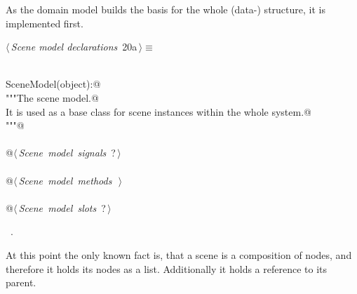 \documentclass[
    a4paper,      %
    10pt,         %
    openright,    %
    notitlepage,  %
    parskip=half, %
]{scrreprt}       %
\theoremstyle{definition}                    %
\begin{document}
As the domain model builds the basis for the whole (data-) structure, it is
implemented first.

\begin{flushleft} \small
\begin{minipage}{\linewidth}\label{scrap12}\raggedright\small
{} $\langle\,${\itshape Scene model declarations}\nobreak\ {\footnotesize {20a}}$\,\rangle\equiv$
\vspace{-1ex}
\begin{list}{}{} \item
\mbox{}\lstinline@@\\
\mbox{}\lstinline@class SceneModel(object):@\\
\mbox{}\lstinline@    """The scene model.@\\
\mbox{}\lstinline@    It is used as a base class for scene instances within the whole system.@\\
\mbox{}\lstinline@    """@\\
\mbox{}\lstinline@@\\
\mbox{}\lstinline@    @\hbox{$\langle\,${\itshape Scene model signals}\nobreak\ {\footnotesize ?}$\,\rangle$}\lstinline@@\\
\mbox{}\lstinline@@\\
\mbox{}\lstinline@    @\hbox{$\langle\,${\itshape Scene model methods}\nobreak\ {\footnotesize {}}$\,\rangle$}\lstinline@@\\
\mbox{}\lstinline@@\\
\mbox{}\lstinline@    @\hbox{$\langle\,${\itshape Scene model slots}\nobreak\ {\footnotesize ?}$\,\rangle$}\lstinline@@\\
\mbox{}\lstinline@@{\NWsep}
\end{list}
\vspace{-1.5ex}
\footnotesize
\begin{list}{}{\setlength{\itemsep}{-\parsep}\setlength{\itemindent}{-\leftmargin}}
\item \NWtxtMacroRefIn\ .

\item{}
\end{list}
\end{minipage}\vspace{4ex}
\end{flushleft}
At this point the only known fact is, that a scene is a composition of nodes,
and therefore it holds its nodes as a list. Additionally it holds a reference to
its parent.
\end{document}
